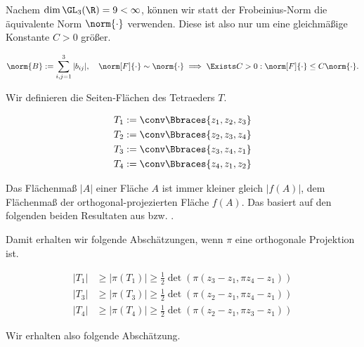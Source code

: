 \begin{solution}
Nachem $\dim \GL_3(\R) = 9 < \infty$, können wir statt der Frobeinius-Norm die äquivalente Norm $\norm{\cdot}$ verwenden.
Diese ist also nur um eine gleichmäßige Konstante $C > 0$ größer.

\begin{align*}
  \norm{B}
  :=
  \sum_{i,j=1}^3 |b_{ij}|,
  \quad
  \norm[F]{\cdot}
  \sim
  \norm{\cdot}
  \implies
  \Exists C > 0:
  \norm[F]{\cdot}
  \leq
  C \norm{\cdot}.
\end{align*}

Wir definieren die Seiten-Flächen des Tetraeders $T$.

\begin{align*}
  T_1 & := \conv \Bbraces{z_1, z_2, z_3} \\
  T_2 & := \conv \Bbraces{z_2, z_3, z_4} \\
  T_3 & := \conv \Bbraces{z_3, z_4, z_1} \\
  T_4 & := \conv \Bbraces{z_4, z_1, z_2}
\end{align*}

Das Flächenmaß $|A|$ einer Fläche $A$ ist immer kleiner gleich $|f(A)|$, dem Flächenmaß der orthogonal-projezierten Fläche $f(A)$.
Das basiert auf den folgenden beiden Resultaten aus \cite{Ana3} bzw. \cite{FAna1}.


Damit erhalten wir folgende Abschätzungen, wenn $\pi$ eine orthogonale Projektion ist.

\begin{align*}
  |T_1| & \geq |\pi(T_1)| \geq \frac{1}{2} \det(\pi(z_3 - z_1, \pi z_4 - z_1)) \\
  |T_3| & \geq |\pi(T_3)| \geq \frac{1}{2} \det(\pi(z_2 - z_1, \pi z_4 - z_1)) \\
  |T_4| & \geq |\pi(T_4)| \geq \frac{1}{2} \det(\pi(z_2 - z_1, \pi z_3 - z_1))
\end{align*}

Wir erhalten also folgende Abschätzung.


\end{solution}
